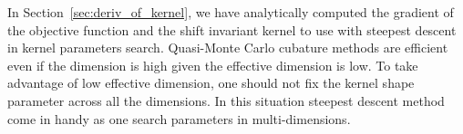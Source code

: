 \documentclass{iitthesis}          %
\newcommand\secref{Section~\ref}
\begin{document}
{{{{{{%
In \secref{sec:deriv_of_kernel}, we have analytically computed the gradient of the objective function and the shift invariant kernel to use with steepest descent in kernel parameters search. 
Quasi-Monte Carlo cubature methods are efficient \cite{SloWoz98} even if the dimension is high given the effective dimension is low.
To take advantage of low effective dimension, one should not fix the kernel shape parameter across all the dimensions. In this situation steepest descent method come in handy as one search parameters in multi-dimensions. 

% 

}}}}}}
\end{document}
